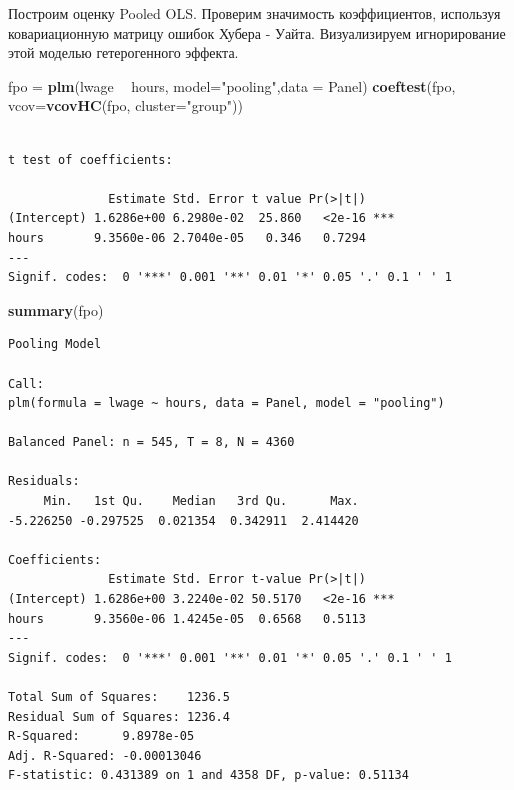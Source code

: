 \documentclass[]{book}
\newenvironment{Shaded}{\begin{snugshade}}{\end{snugshade}}
\newcommand{\DataTypeTok}[1]{\textcolor[rgb]{0.13,0.29,0.53}{#1}}
\newcommand{\KeywordTok}[1]{\textcolor[rgb]{0.13,0.29,0.53}{\textbf{#1}}}
\newcommand{\NormalTok}[1]{#1}
\newcommand{\OperatorTok}[1]{\textcolor[rgb]{0.81,0.36,0.00}{\textbf{#1}}}
\newcommand{\StringTok}[1]{\textcolor[rgb]{0.31,0.60,0.02}{#1}}
\begin{document}
Построим оценку Pooled OLS. Проверим значимость коэффициентов, используя ковариационную матрицу ошибок Хубера - Уайта. Визуализируем игнорирование этой моделью гетерогенного эффекта.

\begin{Shaded}
\begin{Highlighting}[]
\NormalTok{fpo =}\StringTok{ }\KeywordTok{plm}\NormalTok{(lwage }\OperatorTok{~}\StringTok{ }\NormalTok{hours, }\DataTypeTok{model=}\StringTok{"pooling"}\NormalTok{,}\DataTypeTok{data =}\NormalTok{ Panel)}
\KeywordTok{coeftest}\NormalTok{(fpo, }\DataTypeTok{vcov=}\KeywordTok{vcovHC}\NormalTok{(fpo, }\DataTypeTok{cluster=}\StringTok{"group"}\NormalTok{))}
\end{Highlighting}
\end{Shaded}

\begin{verbatim}

t test of coefficients:

              Estimate Std. Error t value Pr(>|t|)    
(Intercept) 1.6286e+00 6.2980e-02  25.860   <2e-16 ***
hours       9.3560e-06 2.7040e-05   0.346   0.7294    
---
Signif. codes:  0 '***' 0.001 '**' 0.01 '*' 0.05 '.' 0.1 ' ' 1
\end{verbatim}

\begin{Shaded}
\begin{Highlighting}[]
\KeywordTok{summary}\NormalTok{(fpo)}
\end{Highlighting}
\end{Shaded}

\begin{verbatim}
Pooling Model

Call:
plm(formula = lwage ~ hours, data = Panel, model = "pooling")

Balanced Panel: n = 545, T = 8, N = 4360

Residuals:
     Min.   1st Qu.    Median   3rd Qu.      Max. 
-5.226250 -0.297525  0.021354  0.342911  2.414420 

Coefficients:
              Estimate Std. Error t-value Pr(>|t|)    
(Intercept) 1.6286e+00 3.2240e-02 50.5170   <2e-16 ***
hours       9.3560e-06 1.4245e-05  0.6568   0.5113    
---
Signif. codes:  0 '***' 0.001 '**' 0.01 '*' 0.05 '.' 0.1 ' ' 1

Total Sum of Squares:    1236.5
Residual Sum of Squares: 1236.4
R-Squared:      9.8978e-05
Adj. R-Squared: -0.00013046
F-statistic: 0.431389 on 1 and 4358 DF, p-value: 0.51134
\end{verbatim}
\end{document}

